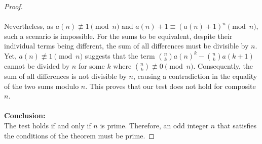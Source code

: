 \documentclass{article}
\theoremstyle{plain}
\begin{document}
\begin{proof}
\\
\\
Nevertheless, as $a(n) \not\equiv 1 \pmod{n}$ and $a(n) + 1 \equiv (a(n) + 1)^{n} \pmod{n}$, such a scenario is impossible. For the sums to be equivalent, despite their individual terms being different, the sum of all differences must be divisible by $n$. Yet, $a(n) \not\equiv 1 \pmod{n}$ suggests that the term $\binom{n}{k}a(n)^k - \binom{n}{k}a(k+1)$ cannot be divided by $n$ for some $k$ where $\binom{n}{k} \not\equiv 0 \pmod{n}$. Consequently, the sum of all differences is not divisible by $n$, causing a contradiction in the equality of the two sums modulo $n$. This proves that our test does not hold for composite $n$.
\\
\\
\textbf{Conclusion:}
\\
The test holds if and only if $n$ is prime. Therefore, an odd integer $n$ that satisfies the conditions of the theorem must be prime.
\end{proof}
\end{document}
